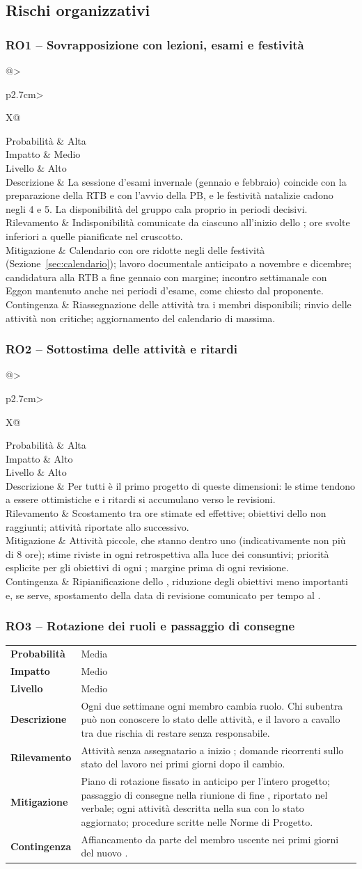 \documentclass[documento]{gpt}
\makeatletter
\newcommand{\rischio}[9]{%
  \subsubsection{#1 -- #2}\label{rischio:#1}
  \noindent
  \begin{tabularx}{\linewidth}{@{}>{\raggedright\arraybackslash\bfseries}p{2.7cm}>{\raggedright\arraybackslash}X@{}}
    \toprule
    Probabilità & #3 \\
    Impatto     & #4 \\
    Livello     & #5 \\
    \midrule
    Descrizione & #6 \\
    \addlinespace
    Rilevamento & #7 \\
    \addlinespace
    Mitigazione & #8 \\
    \addlinespace
    Contingenza & #9 \\
    \bottomrule
  \end{tabularx}
  \medskip
}
\makeatother
\begin{document}
\subsection{Rischi organizzativi}

\rischio{RO1}{Sovrapposizione con lezioni, esami e festività}{Alta}{Medio}{Alto}
{La sessione d'esami invernale (gennaio e febbraio) coincide con la
 preparazione della RTB e con l'avvio della PB, e le festività natalizie
 cadono negli \glo[Sprint]{\textit{sprint}} 4 e 5. La disponibilità del gruppo cala
 proprio in periodi decisivi.}
{Indisponibilità comunicate da ciascuno all'inizio dello \glo[Sprint]{\textit{sprint}};
 ore svolte inferiori a quelle pianificate nel cruscotto.}
{Calendario con ore ridotte negli \glo[Sprint]{\textit{sprint}} delle festività
 (Sezione~\ref{sec:calendario}); lavoro documentale anticipato a novembre e
 dicembre; candidatura alla RTB a fine gennaio con margine; incontro
 settimanale con Eggon mantenuto anche nei periodi d'esame, come chiesto
 dal proponente.}
{Riassegnazione delle attività tra i membri disponibili; rinvio delle
 attività non critiche; aggiornamento del calendario di massima.}

\rischio{RO2}{Sottostima delle attività e ritardi}{Alta}{Alto}{Alto}
{Per tutti è il primo progetto di queste dimensioni: le stime tendono a
 essere ottimistiche e i ritardi si accumulano verso le revisioni.}
{Scostamento tra ore stimate ed effettive; obiettivi dello \glo[Sprint]{\textit{sprint}}
 non raggiunti; attività riportate allo \glo[Sprint]{\textit{sprint}} successivo.}
{Attività piccole, che stanno dentro uno \glo[Sprint]{\textit{sprint}} (indicativamente
 non più di 8 ore); stime riviste in ogni retrospettiva alla luce dei
 consuntivi; priorità esplicite per gli obiettivi di ogni \glo[Sprint]{\textit{sprint}};
 margine prima di ogni revisione.}
{Ripianificazione dello \glo[Sprint]{\textit{sprint}}, riduzione degli obiettivi meno
 importanti e, se serve, spostamento della data di revisione comunicato
 per tempo al \glo{Committente}.}

\rischio{RO3}{Rotazione dei ruoli e passaggio di consegne}{Media}{Medio}{Medio}
{Ogni due settimane ogni membro cambia ruolo. Chi subentra può non
 conoscere lo stato delle attività, e il lavoro a cavallo tra due
 \glo[Sprint]{\textit{sprint}} rischia di restare senza responsabile.}
{Attività senza assegnatario a inizio \glo[Sprint]{\textit{sprint}}; domande ricorrenti
 sullo stato del lavoro nei primi giorni dopo il cambio.}
{Piano di rotazione fissato in anticipo per l'intero progetto; passaggio
 di consegne nella riunione di fine \glo[Sprint]{\textit{sprint}}, riportato nel
 verbale; ogni attività descritta nella sua \glo[Issue]{\textit{issue}} con lo stato aggiornato;
 procedure scritte nelle Norme di Progetto.}
{Affiancamento da parte del membro uscente nei primi giorni del nuovo
 \glo[Sprint]{\textit{sprint}}.}
\end{document}
